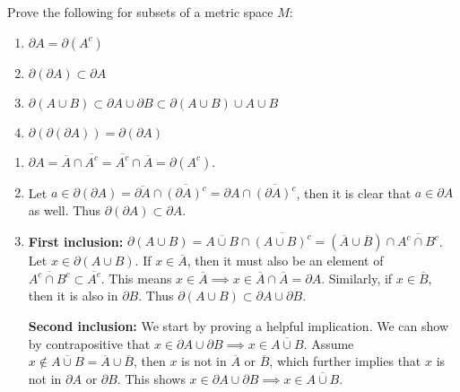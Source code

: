 \documentclass[10pt]{amsart}
\theoremstyle{plain}
\newenvironment{exercise}[1]{%
  \renewcommand\themanualtheoreminner{#1}%
  \manualtheoreminner
}{\endmanualtheoreminner}
\theoremstyle{definition}
\newcommand{\p}{\partial}
\begin{document}
\begin{exercise}{2.15}
	Prove the following for subsets of a metric space $M$:
	\begin{enumerate}
		\item $\p A = \p(A^c)$ 
		\item $\p (\p A) \subset \p A$
		\item $\p (A \cup B) \subset \p A \cup \p B \subset \p(A \cup B) \cup A \cup B$
		\item $\p (\p (\p A)) = \p (\p A)$
	\end{enumerate}
	\hrulefill
\end{exercise}
\begin{enumerate}
	\item $\p A = \overline{A} \cap \overline{A^c} = \overline{A^c} \cap \overline{A} = \p(A^c)$.
	\item Let $a \in \p(\p A) = \overline{\p A} \cap \overline{(\p A)^c} = \p A \cap \overline{(\p A)^c} $, then it is clear that $a \in \p A$ as well. Thus  $\p(\p A) \subset \p A$.
	\item
		\textbf{First inclusion:} $\p (A \cup B) = \overline{A \cup B} \cap \overline{(A \cup B)^c} = (\overline{A} \cup \overline{B}) \cap \overline{A^c \cap B^c}$. Let $x \in \p (A \cup B)$. If $x \in \overline{A}$, then it must also be an element of $\overline{A^c \cap B^c} \subset \overline{A^c} $. This means $x \in \overline{A} \implies x \in \overline{A} \cap \overline{A} = \p A$. Similarly, if $x \in \overline{B}$, then it is also in $\p B$. Thus $\p(A \cup B) \subset \p A \cup \p B$.

		\textbf{Second inclusion:} We start by proving a helpful implication. We can show by contrapositive that $x \in \p A \cup \p B \implies x \in \overline{A \cup B} $. Assume $x \not\in \overline{A \cup B} = \overline{A} \cup \overline{B}$, then $x$ is not in $\overline{A}$ or $\overline{B}$, which further implies that $x$ is not in $\p A$ or $\p B$. This shows $x \in \p A \cup \p B \implies x \in \overline{A \cup B} $.


\end{enumerate}
\end{document}
